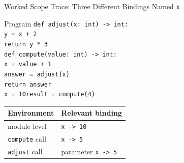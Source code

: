 \documentclass[aspectratio=169,10pt]{beamer}
\begin{document}
\begin{frame}[shrink=4]{Worked Scope Trace: Three Different Bindings Named \texttt{x}}
  \begin{block}{Program}
    \texttt{def adjust(x: int) -> int:}\\
    \hspace*{0.20in}\texttt{y = x + 2}\\
    \hspace*{0.20in}\texttt{return y * 3}\\[0.05in]
    \texttt{def compute(value: int) -> int:}\\
    \hspace*{0.20in}\texttt{x = value + 1}\\
    \hspace*{0.20in}\texttt{answer = adjust(x)}\\
    \hspace*{0.20in}\texttt{return answer}\\[0.05in]
    \texttt{x = 10}\qquad \texttt{result = compute(4)}
  \end{block}

  \begin{center}
    \renewcommand{\arraystretch}{1.2}
    \begin{tabular}{l|l}
      \textbf{Environment} & \textbf{Relevant binding} \\\hline
      module level & \texttt{x -> 10} \\
      \texttt{compute} call & \texttt{x -> 5} \\
      \texttt{adjust} call & parameter \texttt{x -> 5}
    \end{tabular}
  \end{center}
\end{frame}
\end{document}
